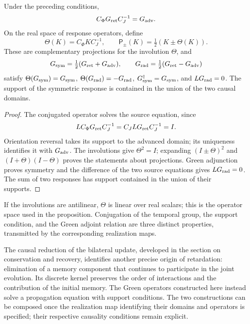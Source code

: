 \begin{proposition}
\label{x_reciprocidad:vii:prop:green-paridades}
Under the preceding conditions,
\[
 C_\Phi G_{\rm ret}C_J^{-1}=G_{\rm adv}.
\]
On the real space of response operators, define
\[
 \Theta(K)=C_\Phi K C_J^{-1},\qquad
 \mathsf P_\pm(K)=\tfrac12(K\pm\Theta(K)).
\]
These are complementary projections for the involution \(\Theta\), and
\begin{equation}
 G_{\rm sym}=\tfrac12(G_{\rm ret}+G_{\rm adv}),\qquad
 G_{\rm rad}=\tfrac12(G_{\rm ret}-G_{\rm adv})
 \label{x_reciprocidad:vii:eq:descomposicion-green}
\end{equation}
satisfy \(\Theta(G_{\rm sym})=G_{\rm sym}\),
\(\Theta(G_{\rm rad})=-G_{\rm rad}\),
\(G_{\rm sym}^{\dagger}=G_{\rm sym}\), and
\(LG_{\rm rad}=0\). The support of the symmetric response is contained
in the union of the two causal domains.
\end{proposition}
\begin{proof}
The conjugated operator solves the source equation, since
\[
 LC_\Phi G_{\rm ret}C_J^{-1}=C_JLG_{\rm ret}C_J^{-1}=I.
\]
Orientation reversal takes its support to the advanced domain;
its uniqueness identifies it with \(G_{\rm adv}\). The involutions give
\(\Theta^2=I\); expanding \((I\pm\Theta)^2\) and
\((I+\Theta)(I-\Theta)\) proves the statements about projections.
Green adjunction proves symmetry and the difference of the two
source equations gives \(LG_{\rm rad}=0\). The sum of two responses
has support contained in the union of their supports.
\end{proof}

If the involutions are antilinear, \(\Theta\) is linear over
real scalars; this is the operator space used in the proposition.
Conjugation of the temporal group, the support condition, and the
Green adjoint relation are three distinct properties, transmitted by the
corresponding realization maps.

The causal reduction of the bilateral update, developed in the section
on conservation and recovery, identifies another precise origin of
retardation: elimination of a memory component that continues to
participate in the joint evolution. Its discrete kernel preserves the
order of interactions and the contribution of the initial memory.
The Green operators constructed here instead solve a propagation
equation with support conditions. The two constructions can be composed
once the realization map identifying their domains and operators is
specified; their respective causality conditions remain explicit.

